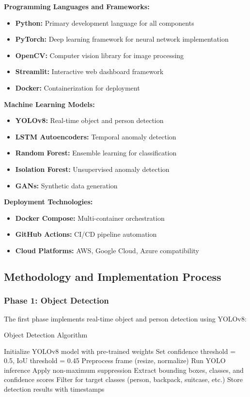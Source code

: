 \documentclass[12pt,a4paper]{article}
\begin{document}
\textbf{Programming Languages and Frameworks:}
\begin{itemize}
    \item \textbf{Python:} Primary development language for all components
    \item \textbf{PyTorch:} Deep learning framework for neural network implementation
    \item \textbf{OpenCV:} Computer vision library for image processing
    \item \textbf{Streamlit:} Interactive web dashboard framework
    \item \textbf{Docker:} Containerization for deployment
\end{itemize}

\textbf{Machine Learning Models:}
\begin{itemize}
    \item \textbf{YOLOv8:} Real-time object and person detection
    \item \textbf{LSTM Autoencoders:} Temporal anomaly detection
    \item \textbf{Random Forest:} Ensemble learning for classification
    \item \textbf{Isolation Forest:} Unsupervised anomaly detection
    \item \textbf{GANs:} Synthetic data generation
\end{itemize}

\textbf{Deployment Technologies:}
\begin{itemize}
    \item \textbf{Docker Compose:} Multi-container orchestration
    \item \textbf{GitHub Actions:} CI/CD pipeline automation
    \item \textbf{Cloud Platforms:} AWS, Google Cloud, Azure compatibility
\end{itemize}

\subsection{Methodology and Implementation Process}

\subsubsection{Phase 1: Object Detection}

The first phase implements real-time object and person detection using YOLOv8:

\begin{algorithm}[H]
\caption{Object Detection Algorithm}
\begin{algorithmic}[1]
\STATE Initialize YOLOv8 model with pre-trained weights
\STATE Set confidence threshold = 0.5, IoU threshold = 0.45
    \STATE Preprocess frame (resize, normalize)
    \STATE Run YOLO inference
    \STATE Apply non-maximum suppression
    \STATE Extract bounding boxes, classes, and confidence scores
    \STATE Filter for target classes (person, backpack, suitcase, etc.)
    \STATE Store detection results with timestamps
\ENDFOR
\end{algorithmic}
\end{algorithm}
\end{document}
